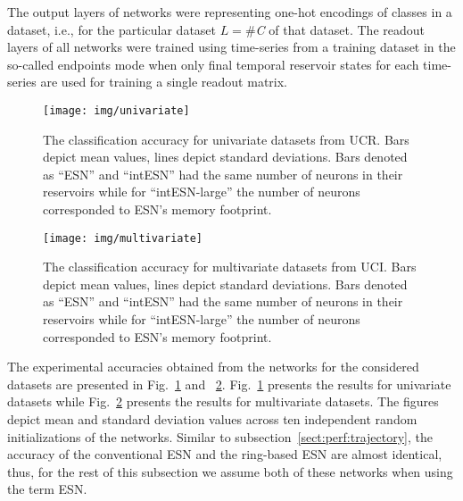 The output layers of networks were representing one-hot encodings of classes in a dataset, i.e., for the particular dataset $L=$\#\textit{C} of that dataset. 
The readout layers of all networks were trained using time-series from a training dataset in the so-called endpoints mode \cite{ComparisonReadOut} when only final temporal reservoir states for each time-series  are used for training a single readout matrix. 


\begin{figure}[tb]%
\centering
\texttt{[image: img/univariate]}
\caption{The classification accuracy for univariate datasets from UCR. Bars depict mean values, lines depict standard deviations.  Bars denoted as ``ESN'' and ``intESN'' had the same number of neurons in their reservoirs while for ``intESN-large'' the number of neurons corresponded to ESN's memory footprint. 
}
\label{fig:univar}
\end{figure}




\begin{figure}[tb]%
\centering
\texttt{[image: img/multivariate]}
\caption{The classification accuracy for multivariate datasets from UCI. Bars depict mean values, lines depict standard deviations. Bars denoted as ``ESN'' and ``intESN'' had the same number of neurons in their reservoirs while for ``intESN-large'' the number of neurons corresponded to ESN's memory footprint. 
}
\label{fig:multivar}
\end{figure}




The experimental accuracies obtained from the networks for the considered datasets are presented in Fig.~\ref{fig:univar} and ~\ref{fig:multivar}. Fig.~\ref{fig:univar} presents the results for univariate datasets while Fig.~\ref{fig:multivar} presents the results for multivariate datasets. The figures depict mean and standard deviation values across ten independent random initializations of the networks.
Similar to subsection~\ref{sect:perf:trajectory}, the accuracy of the conventional ESN and the ring-based ESN are almost identical, thus, for the rest of this subsection we assume both of these networks when using the term ESN.  



